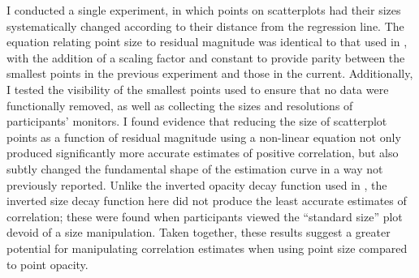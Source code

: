 \documentclass[../main.tex]{subfiles}
\begin{document}
I conducted a single experiment, in which points on scatterplots had
their sizes systematically changed according to their distance from the
regression line. The equation relating point size to residual magnitude
was identical to that used in , with the
addition of a scaling factor and constant to provide parity between the
smallest points in the previous experiment and those in the current.
Additionally, I tested the visibility of the smallest points used to
ensure that no data were functionally removed, as well as collecting the
sizes and resolutions of participants' monitors. I found evidence that
reducing the size of scatterplot points as a function of residual
magnitude using a non-linear equation not only produced significantly
more accurate estimates of positive correlation, but also subtly changed
the fundamental shape of the estimation curve in a way not previously
reported. Unlike the inverted opacity decay function used in
, the inverted size decay function here did
not produce the least accurate estimates of correlation; these were
found when participants viewed the ``standard size'' plot devoid of a
size manipulation. Taken together, these results suggest a greater
potential for manipulating correlation estimates when using point size
compared to point opacity.
\end{document}
